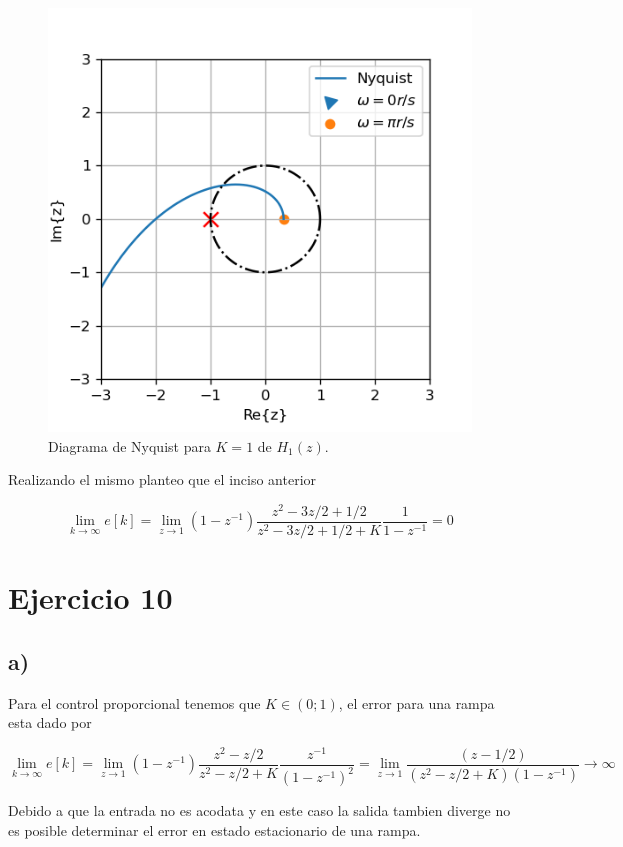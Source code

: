 \documentclass{article}
\begin{document}
        \begin{figure}[!htb]
            \centering
            \includegraphics[width=.5\textwidth]{Img/9-b-nyquist.png}
            \caption{Diagrama de Nyquist para $K=1$ de $H_1(z)$.}
            \label{fig:9-b-nyquist}
        \end{figure}

        Realizando el mismo planteo que el inciso anterior 

        \begin{equation}
            \lim_{k \to \infty} e[k] = 
            \lim_{z \to 1} (1 - z^{-1}) \frac{z^2 - 3z/2 + 1/2}{z^2 - 3z/2 + 1/2 + K} \frac{1}{1-z^{-1}} = 0
        \end{equation}

    \section{Ejercicio 10}

        \subsection{a)}

            Para el control proporcional tenemos que $K \in (0;1)$, el error para una rampa esta dado por 

            \begin{equation}
                \lim_{k \to \infty} e[k] = \lim_{z \to 1} (1 - z^{-1}) \frac{z^2 - z/2}{z^2 - z/2 + K} \frac{z^{-1}}{(1-z^{-1})^2}
                = \lim_{z \to 1} \frac{(z-1/2)}{(z^2 - z/2 + K)(1-z^{-1})} \to \infty
            \end{equation}
    
            Debido a que la entrada no es acodata y en este caso la salida tambien diverge no es posible determinar el error en 
            estado estacionario de una rampa.
\end{document}
